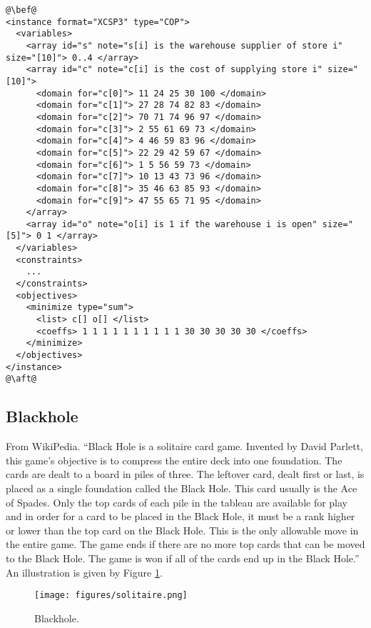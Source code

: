 \documentclass[10pt]{article}
\begin{document}
\begin{lstlisting}
@\bef@
<instance format="XCSP3" type="COP">
  <variables>
    <array id="s" note="s[i] is the warehouse supplier of store i" size="[10]"> 0..4 </array>
    <array id="c" note="c[i] is the cost of supplying store i" size="[10]">
      <domain for="c[0]"> 11 24 25 30 100 </domain>
      <domain for="c[1]"> 27 28 74 82 83 </domain>
      <domain for="c[2]"> 70 71 74 96 97 </domain>
      <domain for="c[3]"> 2 55 61 69 73 </domain>
      <domain for="c[4]"> 4 46 59 83 96 </domain>
      <domain for="c[5]"> 22 29 42 59 67 </domain>
      <domain for="c[6]"> 1 5 56 59 73 </domain>
      <domain for="c[7]"> 10 13 43 73 96 </domain>
      <domain for="c[8]"> 35 46 63 85 93 </domain>
      <domain for="c[9]"> 47 55 65 71 95 </domain>
    </array>
    <array id="o" note="o[i] is 1 if the warehouse i is open" size="[5]"> 0 1 </array>
  </variables>
  <constraints>
    ...
  </constraints>
  <objectives>
    <minimize type="sum">
      <list> c[] o[] </list>
      <coeffs> 1 1 1 1 1 1 1 1 1 1 30 30 30 30 30 </coeffs>
    </minimize>
  </objectives>
</instance>
@\aft@
\end{lstlisting}


\subsection{Blackhole}

From WikiPedia. ``Black Hole is a solitaire card game. Invented by David Parlett, this game's objective is to compress the entire deck into one foundation.
The cards are dealt to a board in piles of three.
The leftover card, dealt first or last, is placed as a single foundation called the Black Hole.
This card usually is the Ace of Spades.
Only the top cards of each pile in the tableau are available for play and in order for a card to be placed in the Black Hole, it must be a rank higher or lower than the top card on the Black Hole. This is the only allowable move in the entire game.
The game ends if there are no more top cards that can be moved to the Black Hole. The game is won if all of the cards end up in the Black Hole.''
An illustration is given by Figure \ref{fig:solitaire}.

\begin{figure}[h]
\begin{center}
  \texttt{[image: figures/solitaire.png]}
\end{center}
\caption{Blackhole.\label{fig:solitaire}}
\end{figure}
\end{document}
